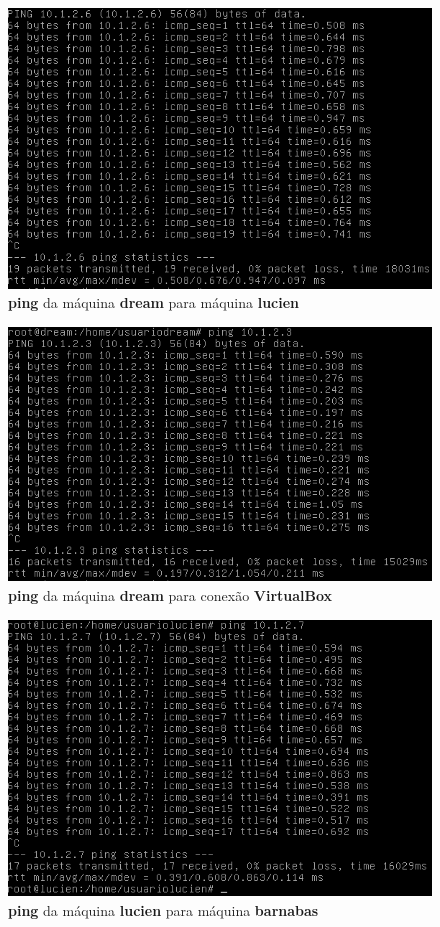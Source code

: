 \documentclass[a4paper, 12pt]{article}
\begin{document}
\begin{enumerate}
\begin{figure}[h!]
\centering
\includegraphics[width=\textwidth]{1-ping-dream-lucien.png}
\caption{{\bf ping} da máquina {\bf dream} para máquina {\bf lucien}}
\end{figure}

\begin{figure}[h!]
\centering
\includegraphics[width=\textwidth]{1-ping-dream-VB.png}
\caption{{\bf ping} da máquina {\bf dream} para conexão {\bf VirtualBox}}
\end{figure}

\begin{figure}[h!]
\centering
\includegraphics[width=\textwidth]{1-ping-lucien-barnabas.png}
\caption{{\bf ping} da máquina {\bf lucien} para máquina {\bf barnabas}}
\end{figure}


\end{enumerate}
\end{document}
